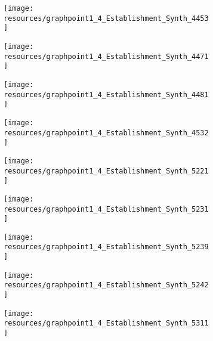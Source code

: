 \documentclass[12pt]{article}
\begin{document}
\begin{figure}[H]
	\centering
	\begin{subfigure}[b]{0.4\textwidth}
	    \texttt{[image: resources/graphpoint1\_4\_Establishment\_Synth\_4453]}
	\end{subfigure}
	\begin{subfigure}[b]{0.4\textwidth}
	    \texttt{[image: resources/graphpoint1\_4\_Establishment\_Synth\_4471]}
	\end{subfigure}
\end{figure}

\begin{figure}[H]
	\centering
	\begin{subfigure}[b]{0.4\textwidth}
	    \texttt{[image: resources/graphpoint1\_4\_Establishment\_Synth\_4481]}
	\end{subfigure}
	\begin{subfigure}[b]{0.4\textwidth}
	    \texttt{[image: resources/graphpoint1\_4\_Establishment\_Synth\_4532]}
	\end{subfigure}
\end{figure}

\begin{figure}[H]
	\centering
	\begin{subfigure}[b]{0.4\textwidth}
	    \texttt{[image: resources/graphpoint1\_4\_Establishment\_Synth\_5221]}
	\end{subfigure}
\end{figure}

\begin{figure}[H]
	\centering
	\begin{subfigure}[b]{0.4\textwidth}
	    \texttt{[image: resources/graphpoint1\_4\_Establishment\_Synth\_5231]}
	\end{subfigure}
	\begin{subfigure}[b]{0.4\textwidth}
	    \texttt{[image: resources/graphpoint1\_4\_Establishment\_Synth\_5239]}
	\end{subfigure}
\end{figure}

\begin{figure}[H]
	\centering
	\begin{subfigure}[b]{0.4\textwidth}
	    \texttt{[image: resources/graphpoint1\_4\_Establishment\_Synth\_5242]}
	\end{subfigure}
	\begin{subfigure}[b]{0.4\textwidth}
	    \texttt{[image: resources/graphpoint1\_4\_Establishment\_Synth\_5311]}
	\end{subfigure}
\end{figure}
\end{document}
